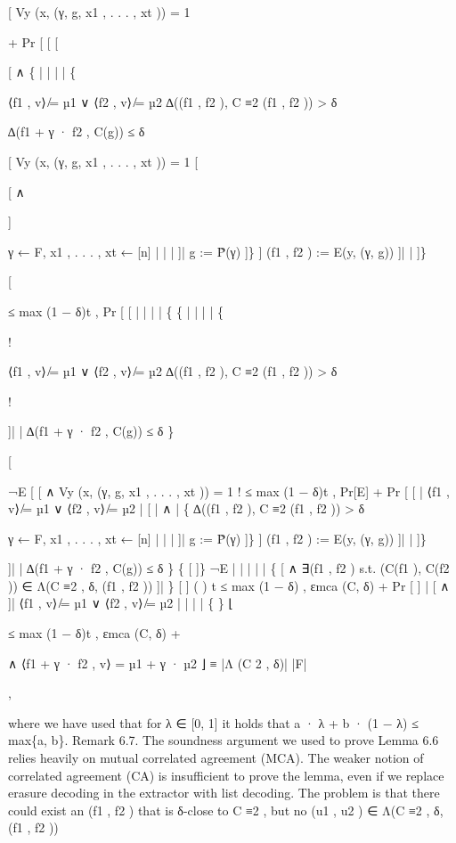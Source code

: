 \documentclass[11pt]{article}
\begin{document}
[ Vy (x, (γ, g, x1 , . . . , xt )) = 1

+ Pr [
[
[

[ ∧
\{
|
|
|
|
\{

⟨f1 , v⟩ ̸= µ1 ∨ ⟨f2 , v⟩ ̸= µ2
∆((f1 , f2 ), C ≡2 (f1 , f2 )) > δ

∆(f1 + γ · f2 , C(g)) ≤ δ

[ Vy (x, (γ, g, x1 , . . . , xt )) = 1
[

[ ∧

]

γ ← F, x1 , . . . , xt ← [n] |
|
|
]|
g := P̃(γ)
]\}
]
(f1 , f2 ) := E(y, (γ, g)) ]|
|
]\}

[

≤ max (1 − δ)t , Pr [
[
|
|
|
|
\{
\{
|
|
|
|
\{

!

⟨f1 , v⟩ ̸= µ1 ∨ ⟨f2 , v⟩ ̸= µ2
∆((f1 , f2 ), C ≡2 (f1 , f2 )) > δ

!

]|
|
∆(f1 + γ · f2 , C(g)) ≤ δ \}

[

¬E
[
[ ∧ Vy (x, (γ, g, x1 , . . . , xt )) = 1
!
≤ max (1 − δ)t , Pr[E] + Pr [
[
|
⟨f1 , v⟩ ̸= µ1 ∨ ⟨f2 , v⟩ ̸= µ2
|
[
|
∧
|
\{
∆((f1 , f2 ), C ≡2 (f1 , f2 )) > δ

γ ← F, x1 , . . . , xt ← [n] |
|
|
]|
g := P̃(γ)
]\}
]
(f1 , f2 ) := E(y, (γ, g)) ]|
|
]\}

]|
|
∆(f1 + γ · f2 , C(g)) ≤ δ \}
\{
[
]\}
¬E
|
|
|
|
|
\{
[ ∧ ∃(f1 , f2 ) s.t. (C(f1 ), C(f2 )) ∈ Λ(C ≡2 , δ, (f1 , f2 )) ]|
\}
[
]
(
)
t
≤ max (1 − δ) , εmca (C, δ) + Pr [
]
|
[ ∧
]|
⟨f1 , v⟩ ̸= µ1 ∨ ⟨f2 , v⟩ ̸= µ2
|
|
|
|
\{
\}
⌊

≤ max (1 − δ)t , εmca (C, δ) +

∧ ⟨f1 + γ · f2 , v⟩ = µ1 + γ · µ2
⌋
≡
|Λ (C 2 , δ)|
|F|

,

where we have used that for λ ∈ [0, 1] it holds that a · λ + b · (1 − λ) ≤ max\{a, b\}.
Remark 6.7. The soundness argument we used to prove Lemma 6.6 relies heavily on mutual
correlated agreement (MCA). The weaker notion of correlated agreement (CA) is insufficient to
prove the lemma, even if we replace erasure decoding in the extractor with list decoding. The
problem is that there could exist an (f1 , f2 ) that is δ-close to C ≡2 , but no (u1 , u2 ) ∈ Λ(C ≡2 , δ, (f1 , f2 ))
\end{document}
